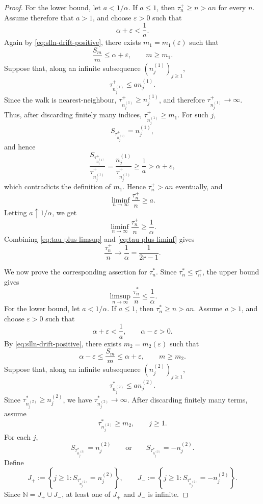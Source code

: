 \documentclass[10pt,a4paper]{amsart}
\begin{document}
\begin{proof}
For the lower bound, let \(a<1/\alpha\). If \(a\le1\), then
\(\tau_n^+\ge n>an\) for every \(n\). Assume therefore that \(a>1\), and choose
\(\varepsilon>0\) such that
\[
  \alpha+\varepsilon<\frac1a.
\]
Again by \eqref{eq:slln-drift-positive}, there exists
\(m_1=m_1(\varepsilon)\) such that
\[
  \frac{S_m}{m}\le \alpha+\varepsilon,
  \qquad m\ge m_1 .
\]
Suppose that, along an infinite subsequence \((n_j^{(1)})_{j\ge1}\),
\[
  \tau_{n_j^{(1)}}^+\le a n_j^{(1)} .
\]
Since the walk is nearest-neighbour, \(\tau_{n_j^{(1)}}^+\ge n_j^{(1)}\), and
therefore \(\tau_{n_j^{(1)}}^+\to\infty\). Thus, after discarding finitely many
indices, \(\tau_{n_j^{(1)}}^+\ge m_1\). For such \(j\),
\[
  S_{\tau_{n_j^{(1)}}^+}=n_j^{(1)},
\]
and hence
\[
  \frac{S_{\tau_{n_j^{(1)}}^+}}{\tau_{n_j^{(1)}}^+}
  =
  \frac{n_j^{(1)}}{\tau_{n_j^{(1)}}^+}
  \ge
  \frac1a
  >
  \alpha+\varepsilon,
\]
which contradicts the definition of \(m_1\). Hence \(\tau_n^+>an\) eventually,
and
\[
  \liminf_{n\to\infty}\frac{\tau_n^+}{n}\ge a.
\]
Letting \(a\uparrow1/\alpha\), we get
\begin{equation}\label{eq:tau-plus-liminf}
  \liminf_{n\to\infty}\frac{\tau_n^+}{n}
  \ge
  \frac1\alpha .
\end{equation}
Combining \eqref{eq:tau-plus-limsup} and \eqref{eq:tau-plus-liminf} gives
\[
  \frac{\tau_n^+}{n}
  \longrightarrow
  \frac1\alpha
  =
  \frac1{2r-1}.
\]

We now prove the corresponding assertion for \(\tau_n^*\). Since
\(\tau_n^*\le\tau_n^+\), the upper bound gives
\[
  \limsup_{n\to\infty}\frac{\tau_n^*}{n}
  \le
  \frac1\alpha.
\]
For the lower bound, let \(a<1/\alpha\). If \(a\le1\), then
\(\tau_n^*\ge n>an\). Assume \(a>1\), and choose \(\varepsilon>0\) such that
\[
  \alpha+\varepsilon<\frac1a,
  \qquad
  \alpha-\varepsilon>0.
\]
By \eqref{eq:slln-drift-positive}, there exists \(m_2=m_2(\varepsilon)\) such
that
\[
  \alpha-\varepsilon
  \le
  \frac{S_m}{m}
  \le
  \alpha+\varepsilon,
  \qquad m\ge m_2 .
\]
Suppose that, along an infinite subsequence \((n_j^{(2)})_{j\ge1}\),
\[
  \tau_{n_j^{(2)}}^*\le a n_j^{(2)} .
\]
Since \(\tau_{n_j^{(2)}}^*\ge n_j^{(2)}\), we have
\(\tau_{n_j^{(2)}}^*\to\infty\). After discarding finitely many terms, assume
\[
  \tau_{n_j^{(2)}}^*\ge m_2,
  \qquad j\ge1.
\]
For each \(j\),
\[
  S_{\tau_{n_j^{(2)}}^*}=n_j^{(2)}
  \qquad\text{or}\qquad
  S_{\tau_{n_j^{(2)}}^*}=-n_j^{(2)}.
\]
Define
\[
  J_+:=\left\{
    j\ge1:
    S_{\tau_{n_j^{(2)}}^*}=n_j^{(2)}
  \right\},
  \qquad
  J_-:=\left\{
    j\ge1:
    S_{\tau_{n_j^{(2)}}^*}=-n_j^{(2)}
  \right\}.
\]
Since \(\mathbb N=J_+\cup J_-\), at least one of \(J_+\) and \(J_-\) is
infinite.


\end{proof}
\end{document}
